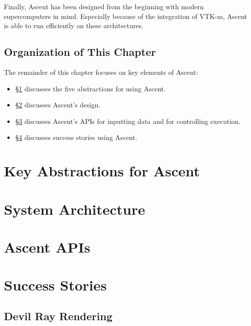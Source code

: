 \documentclass[graybox]{svmult}
\newcommand{\fix}[1]{\textcolor{red}{#1}} %
\begin{document}
Finally, Ascent has been designed from the beginning with modern
supercomputers in mind.
%
Especially because of the integration of VTK-m, Ascent is able to
run efficiently on these architectures.

\subsection{Organization of This Chapter}

The remainder of this chapter focuses on key elements of Ascent:
\begin{itemize}
\item \S\ref{sec:capabilities} discusses the five abstractions for using Ascent.
\item \S\ref{sec:design} discusses Ascent's design.
\item \S\ref{sec:API} discusses Ascent's APIs for inputting
data and for controlling execution.
\item \S\ref{sec:success} discusses success stories using Ascent.
\end{itemize}

\section{Key Abstractions for Ascent}
\label{sec:capabilities}


\section{System Architecture}
\label{sec:design}


\section{Ascent APIs}
\label{sec:API}


\section{Success Stories}
\label{sec:success}


\subsection{Devil Ray Rendering}
\label{sec:DevilRay}


\end{document}
